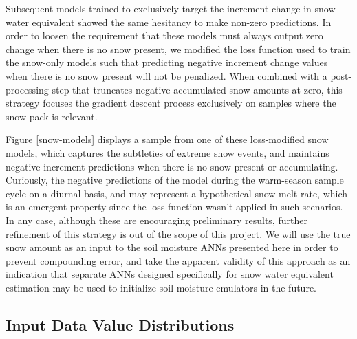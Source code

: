 Subsequent models trained to exclusively target the increment change in snow water equivalent showed the same hesitancy to make non-zero predictions. In order to loosen the requirement that these models must always output zero change when there is no snow present, we modified the loss function used to train the snow-only models such that predicting negative increment change values when there is no snow present will not be penalized. When combined with a post-processing step that truncates negative accumulated snow amounts at zero, this strategy focuses the gradient descent process exclusively on samples where the snow pack is relevant.

Figure \ref{snow-models} displays a sample from one of these loss-modified snow models, which captures the subtleties of extreme snow events, and maintains negative increment predictions when there is no snow present or accumulating. Curiously, the negative predictions of the model during the warm-season sample cycle on a diurnal basis, and may represent a hypothetical snow melt rate, which is an emergent property since the loss function wasn't applied in such scenarios. In any case, although these are encouraging preliminary results, further refinement of this strategy is out of the scope of this project. We will use the true snow amount as an input to the soil moisture ANNs presented here in order to prevent compounding error, and take the apparent validity of this approach as an indication that separate ANNs designed specifically for snow water equivalent estimation may be used to initialize soil moisture emulators in the future.

\subsection{Input Data Value Distributions}

